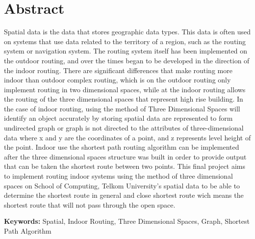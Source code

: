 \chapter*{Abstract}

Spatial data is the data that stores geographic data types. This data is often used on systems that use data related to the territory of a region, such as the routing system or navigation system. The routing system itself has been implemented on the outdoor routing, and over the times began to be developed in the direction of the indoor routing. There are significant differences that make routing more indoor than outdoor complex routing, which is on the outdoor routing only implement routing in two dimensional spaces, while at the indoor routing allows the routing of the three dimensional spaces that represent high rise building. In the case of indoor routing, using the method of Three Dimensional Spaces will identify an object accurately by storing spatial data are represented to form undirected graph or graph is not directed to the attributes of three-dimensional data where x and y are the coordinates of a point, and z represents level height of the point. Indoor use the shortest path routing algorithm can be implemented after the three dimensional spaces structure was built in order to provide output that can be taken the shortest route between two points. This final project aims to implement routing indoor systems using the method of three dimensional spaces on School of Computing, Telkom University’s spatial data to be able to determine the shortest route in general and  close shortest route wich means the shortest route that will not pass through the open space.

\vspace{0.5 cm}
\begin{flushleft}
{\textbf{Keywords:} Spatial, Indoor Routing, Three Dimensional Spaces, Graph, Shortest Path Algorithm}
\end{flushleft}